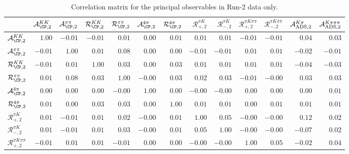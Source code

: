 \begin{table}
\centering
\caption{Correlation matrix for the principal observables in Run-2 data only.}
\begin{tabular}{l|rrrrrrrrrrrr}
& $\mathcal{A}_{\CP,2}^{KK}$& $\mathcal{A}_{\CP,2}^{\pi\pi}$& $\mathcal{R}_{\CP,2}^{KK}$& $\mathcal{R}_{\CP,2}^{\pi\pi}$& $\mathcal{A}_{\CP,2}^{4\pi}$& $\mathcal{R}_{\CP,2}^{4\pi}$& $\mathcal{R}_{+,2}^{\pi K}$& $\mathcal{R}_{-,2}^{\pi K}$& $\mathcal{R}_{+,2}^{\pi K\pi\pi}$& $\mathcal{R}_{-,2}^{\pi K\pi\pi}$& $\mathcal{A}_{\rm ADS,2}^{K\pi}$& $\mathcal{A}_{\rm ADS,2}^{K\pi\pi\pi}$ \\
\midrule

$\mathcal{A}_{\CP,2}^{KK}$ & $1.00$ & $-0.01$ & $-0.01$ & $0.01$ & $0.00$ & $0.01$ & $0.01$ & $0.01$ & $-0.01$ & $-0.01$ & $0.04$ & $0.03$ \\

$\mathcal{A}_{\CP,2}^{\pi\pi}$ & $-0.01$ & $1.00$ & $0.01$ & $0.08$ & $0.00$ & $0.00$ & $-0.01$ & $-0.01$ & $0.01$ & $0.01$ & $-0.02$ & $-0.01$ \\

$\mathcal{R}_{\CP,2}^{KK}$ & $-0.01$ & $0.01$ & $1.00$ & $0.03$ & $0.00$ & $0.03$ & $0.01$ & $0.01$ & $0.01$ & $0.01$ & $-0.04$ & $-0.03$ \\

$\mathcal{R}_{\CP,2}^{\pi\pi}$ & $0.01$ & $0.08$ & $0.03$ & $1.00$ & $-0.00$ & $0.03$ & $0.02$ & $0.03$ & $-0.01$ & $-0.00$ & $0.03$ & $0.03$ \\

$\mathcal{A}_{\CP,2}^{4\pi}$ & $0.00$ & $0.00$ & $0.00$ & $-0.00$ & $1.00$ & $0.00$ & $-0.00$ & $-0.00$ & $0.00$ & $0.00$ & $0.00$ & $0.01$ \\

$\mathcal{R}_{\CP,2}^{4\pi}$ & $0.01$ & $0.00$ & $0.03$ & $0.03$ & $0.00$ & $1.00$ & $0.01$ & $0.01$ & $0.00$ & $0.01$ & $0.01$ & $0.01$ \\

$\mathcal{R}_{+,2}^{\pi K}$ & $0.01$ & $-0.01$ & $0.01$ & $0.02$ & $-0.00$ & $0.01$ & $1.00$ & $0.05$ & $-0.00$ & $-0.00$ & $0.12$ & $0.02$ \\

$\mathcal{R}_{-,2}^{\pi K}$ & $0.01$ & $-0.01$ & $0.01$ & $0.03$ & $-0.00$ & $0.01$ & $0.05$ & $1.00$ & $-0.00$ & $-0.00$ & $-0.07$ & $0.02$ \\

$\mathcal{R}_{+,2}^{\pi K\pi\pi}$ & $-0.01$ & $0.01$ & $0.01$ & $-0.01$ & $0.00$ & $0.00$ & $-0.00$ & $-0.00$ & $1.00$ & $0.05$ & $-0.02$ & $0.04$ \\


\end{tabular}
\end{table}
